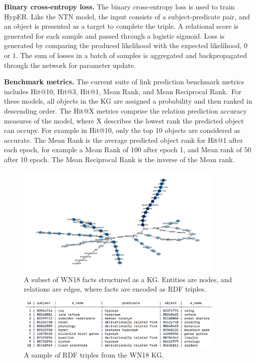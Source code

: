 \noindent \textbf{Binary cross-entropy loss.} The binary cross-entropy loss is used to train HypER. Like the NTN model, the input consists of a subject-predicate pair, and an object is presented as a target to complete the triple. A relational score is generated for each sample and passed through a logistic sigmoid. Loss is generated by comparing the produced likelihood with the expected likelihood, $ 0 $ or $ 1 $. The sum of losses in a batch of samples is aggregated and backpropagated through the network for parameter update. \par

\noindent \textbf{Benchmark metrics.} The current suite of link prediction benchmark metrics includes Hit@10, Hit@3, Hit@1, Mean Rank, and Mean Reciprocal Rank.\ For these models, all objects in the KG are assigned a probability and then ranked in descending order. The Hit@X metrics comprise the relation prediction accuracy measures of the model, where X describes the lowest rank the predicted object can occupy. For example in Hit@10, only the top 10 objects are considered as accurate. The Mean Rank is the average predicted object rank for Hit@1 after each epoch, for example a Mean Rank of 100 after epoch 1, and Mean rank of 50 after 10 epoch. The Mean Reciprocal Rank is the inverse of the Mean rank. 

\begin{figure}
   	\centering
    	\includegraphics[width=0.9\textwidth, height=0.6\textwidth]{WN18_Graph}
	\captionsetup{justification=centering}
	\caption{A subset of WN18 facts structured as a KG. Entities are nodes, and relations are edges, where facts are encoded as RDF triples.}
\end{figure}

\begin{figure}
   	\centering
    	\includegraphics[width=0.9\textwidth, height=0.3\textwidth]{wn18_fact_sample}
	\caption{A sample of RDF triples from the WN18 KG.}
\end{figure}

